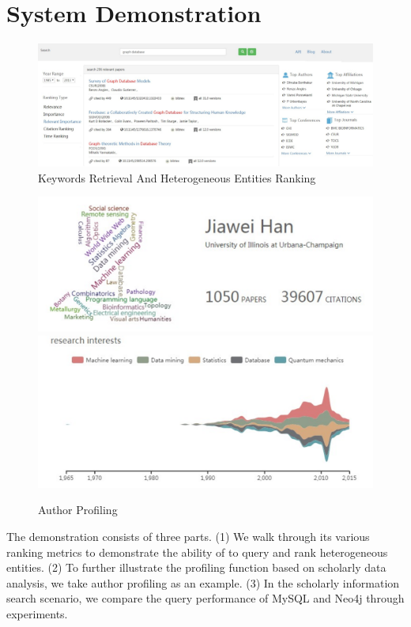 \section{System Demonstration}
\label{sec-demo}

\begin{figure}[tp]
\centering
\includegraphics[width=\textwidth]{searchKeywords.pdf}
\caption{Keywords Retrieval And Heterogeneous Entities Ranking}
\label{fig:searchKeywords}
\vspace{-3ex}
\end{figure}

\begin{figure}
\centering
\includegraphics[width=0.8\columnwidth]{hjwAvatar.pdf}
\includegraphics[width=0.8\columnwidth]{hjwInterest.pdf}
\caption{Author Profiling}
\label{fig:hjwProfile}
\vspace{-3ex}
\end{figure}

The demonstration consists of three parts. (1) We walk through its various ranking metrics to demonstrate the ability of \oursystem to query and rank heterogeneous entities. (2) To further illustrate the profiling function based on scholarly data analysis, we take author profiling as an example. (3) In the scholarly information search scenario, we compare the query performance of MySQL and Neo4j through experiments. 

